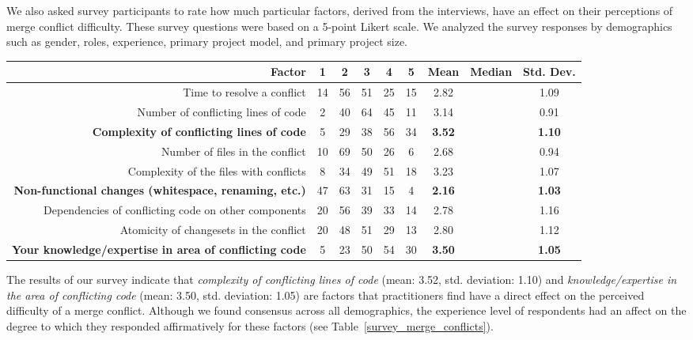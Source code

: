 We also asked survey participants to rate how much particular factors, derived from the interviews, have an effect on their perceptions of merge conflict difficulty.
These survey questions were based on a 5-point Likert scale.
We analyzed the survey responses by demographics such as gender, roles, experience, primary project model, and primary project size.

\begin{table*}[!]
\renewcommand{\arraystretch}{1.3}
\caption{Factors of Merge Conflict Difficulty from Survey}
\label{survey_merge_conflicts}
\centering
\begin{tabularx}{0.9\textwidth}{r | *5{c} | *3{c}}

\toprule
	Factor & 1 & 2 & 3 & 4 & 5 & Mean & Median & Std. Dev. \\
\midrule
	Time to resolve a conflict & 14 & 56 & 51 & 25 & 15 & 2.82 &  & 1.09 \\
	Number of conflicting lines of code & 2 & 40 & 64 & 45 & 11 & 3.14 &  & 0.91 \\
	\textbf{Complexity of conflicting lines of code} & 5 & 29 & 38 & 56 & 34 & \textbf{3.52} & & \textbf{1.10} \\
	Number of files in the conflict & 10 & 69 & 50 & 26 & 6 & 2.68 & & 0.94 \\
	Complexity of the files with conflicts & 8 & 34 & 49 & 51 & 18 & 3.23 & & 1.07 \\
	\textbf{Non-functional changes (whitespace, renaming, etc.)} & 47 & 63 & 31 & 15 & 4 & \textbf{2.16} & & \textbf{1.03} \\
	Dependencies of conflicting code on other components & 20 & 56 & 39 & 33 & 14 & 2.78 & & 1.16 \\
	Atomicity of changesets in the conflict & 20 & 48 & 51 & 29 & 13 & 2.80 & & 1.12 \\
	\textbf{Your knowledge/expertise in area of conflicting code} & 5 & 23 & 50 & 54 & 30 & \textbf{3.50} & & \textbf{1.05} \\
\bottomrule
\end{tabularx}
\end{table*}

The results of our survey indicate that \textit{complexity of conflicting lines of code} (mean: 3.52, std. deviation: 1.10) and \textit{knowledge/expertise in the area of conflicting code} (mean: 3.50, std. deviation: 1.05) are factors that practitioners find have a direct effect on the perceived difficulty of a merge conflict.
Although we found consensus across all demographics, the experience level of respondents had an affect on the degree to which they responded affirmatively for these factors (see Table~\ref{survey_merge_conflicts}).

